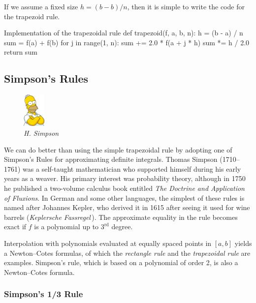 If we assume a fixed size $h = (b - b)/n$, then it is simple to
write the code for the trapezoid rule.

\begin{pylisting}{Implementation of the trapezoidal rule}
def trapezoid(f, a, b, n):
    h = (b - a) / n
    sum = f(a) + f(b)
    for j in range(1, n):
        sum += 2.0 * f(a + j * h)
    sum *= h / 2.0
    return sum
\end{pylisting}

\subsection{Simpson's Rules}


\begin{figure}
  \begin{center}
  \includegraphics[width=0.10\textwidth]{images/homer.png}\\
          \emph{H.\xspace Simpson}
  \end{center}
\end{figure}
We can do better than using the simple trapezoidal rule by adopting one of
Simpson's Rules  for approximating definite
integrals. Thomas Simpson (1710--1761) was a self-taught mathematician who supported himself
during his early years as a weaver. His primary interest was probability theory,
although in 1750 he published a two-volume calculus book entitled \emph{The
Doctrine and Application of Fluxions}. In German and some other languages, the
simplest of these rules is named after Johannes Kepler, who derived it in 1615
after seeing it used for wine barrels (\emph{Keplersche Fassregel}\,). The
approximate equality in the rule becomes exact if $f$ is a polynomial up to
$3^\text{rd}$ degree.

Interpolation with polynomials evaluated at equally spaced points in $[a,b]$
yields a Newton–Cotes formulas, of which the \emph{rectangle rule} and the
\emph{trapezoidal rule} are examples. Simpson's rule, which is based on a
polynomial of order 2, is also a Newton–Cotes formula.

\subsubsection{Simpson's 1/3 Rule}

